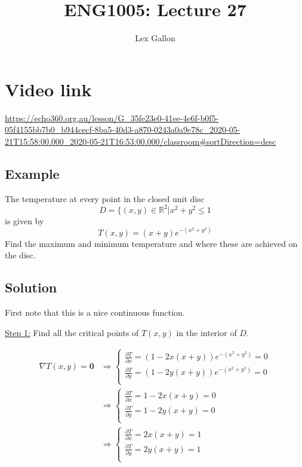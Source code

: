 \documentclass[11pt]{article}
\newcommand{\reals}{\mathbb{R}}
\renewcommand{\vec}[1]{\mathbf{#1}}
\begin{document}
\title{ENG1005: Lecture 27}
\author{Lex Gallon}
\maketitle

\tableofcontents

\section*{Video link}
\url{https://echo360.org.au/lesson/G_35fe23e0-41ee-4e6f-b0f5-05f4155bb7b0_b944cecf-8ba5-40d3-a870-0243a0a9e78c_2020-05-21T15:58:00.000_2020-05-21T16:53:00.000/classroom#sortDirection=desc}

\subsection{Example}
The temperature at every point in the closed unit disc
\[ D = \{ (x, y) \in \reals^2 | x^2 + y^2 \leq 1 \]
is given by
\[ T(x, y) = (x + y)e^{-(x^2 + y^2)} \]
Find the maximum and minimum temperature and where these are achieved on the disc.

\subsection{Solution}
First note that this is a nice continuous function. 

\underline{Step 1:} Find all the critical points of $T(x, y)$ in the interior of $D$.

\begin{align*}
\nabla T(x, y) = \vec{0} &\Rightarrow \left\{ \begin{matrix}
\frac{\partial T}{\partial x} = (1 - 2x(x+y))e^{-(x^2+y^2)} = 0\\
\frac{\partial T}{\partial y} = (1 - 2y(x+y))e^{-(x^2+y^2)} = 0\\
\end{matrix} \right. \\
&\Rightarrow \left\{ \begin{matrix}
\frac{\partial T}{\partial x} = 1 - 2x(x+y) = 0\\
\frac{\partial T}{\partial y} = 1 - 2y(x+y) = 0\\
\end{matrix} \right. \\
&\Rightarrow \left\{ \begin{matrix}
\frac{\partial T}{\partial x} = 2x(x+y) = 1\\
\frac{\partial T}{\partial y} = 2y(x+y) = 1\\
\end{matrix} \right. \\
\end{align*}
\end{document}
